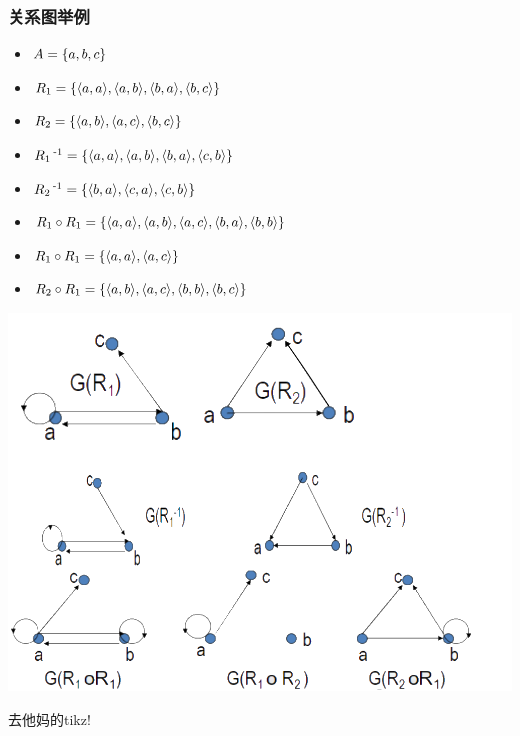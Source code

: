 {{{  \subsubsection{关系图举例}{
    \begin{itemize}
      \item $A = \left\{ a,b,c \right\}$
      \item $R_1 = \left\{ \langle a,a\rangle,\langle a,b\rangle,\langle b,a\rangle,\langle b,c\rangle \right\}$
      \item $R_2 = \left\{ \langle a,b\rangle,\langle a,c\rangle,\langle b,c\rangle \right\}$
      \item $R_1\operatorname{^{-1}} = \left\{ \langle a,a\rangle,\langle a,b\rangle,\langle b,a\rangle,\langle c,b\rangle \right\}$
      \item $R_2\operatorname{^{-1}} = \left\{ \langle b,a\rangle,\langle c,a\rangle,\langle c,b\rangle \right\}$
      \item $R_1 \circ R_1 = \left\{ \langle a,a\rangle,\langle a,b\rangle,\langle a,c\rangle,\langle b,a\rangle,\langle b,b\rangle \right\}$
      \item $R_1 \circ R_1 = \left\{ \langle a,a\rangle,\langle a,c\rangle \right\}$
      \item $R_2 \circ R_1 = \left\{ \langle a,b\rangle,\langle a,c\rangle,\langle b,b\rangle,\langle b,c\rangle \right\}$
    \end{itemize}
    \begin{center}
      \includegraphics[scale=0.5]{resources/dependGraphic_1.png}

      去他妈的tikz!
    \end{center}
  }%

}}}
